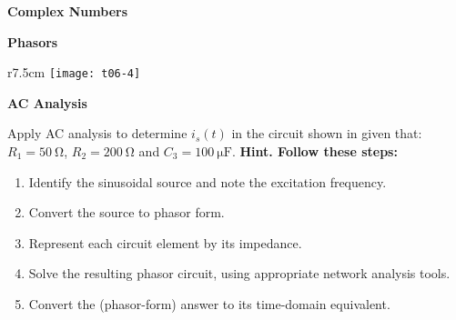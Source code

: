 \documentclass[10pt,a4paper]{memoir}
\begin{document}
\newpage
\begin{question}
  \textbf{Complex Numbers}
  \begin{figure}[!h]
    \centering
    \missingfigure[figwidth=6cm]{}
    \caption{}
  \end{figure}
\end{question}

\newpage
\begin{question}
  \textbf{Phasors}
  \begin{figure}[!h]
    \centering
    \missingfigure[figwidth=6cm]{}
    \caption{}
  \end{figure}
\end{question}

\newpage
\begin{question}
  \begin{wrapfigure}{r}{7.5cm}
    \centering
    \texttt{[image: t06-4]}
    \caption{$v_s(t)=10\cos{\left(100t\right)}$}
    \label{fig:t06-4}
  \end{wrapfigure}
  \textbf{AC Analysis}
  
  Apply AC analysis to determine $i_s(t)$ in the circuit shown in  given that: $R_1 = \SI{50}{\ohm}$, $R_2 = \SI{200}{\ohm}$ and $C_3 = \SI{100}{\micro\farad}$. \textbf{Hint. Follow these steps:}
  \begin{enumerate}
    \item Identify the sinusoidal source and note the excitation frequency.
    \item Convert the source to phasor form.
    \item Represent each circuit element by its impedance.
    \item Solve the resulting phasor circuit, using appropriate network analysis tools.
    \item Convert the (phasor-form) answer to its time-domain equivalent.
  \end{enumerate}
\end{question}
\end{document}
